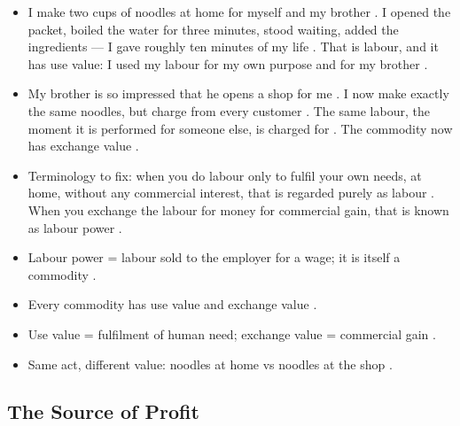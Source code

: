\begin{ExampleBox}
\begin{itemize}
    \item I make two cups of noodles at home for myself and my brother . I opened the packet, boiled the water for three minutes, stood waiting, added the ingredients --- I gave roughly ten minutes of my life . That is labour, and it has use value: I used my labour for my own purpose and for my brother .
    \item My brother is so impressed that he opens a shop for me . I now make exactly the same noodles, but charge  from every customer . The same labour, the moment it is performed for someone else, is charged for . The commodity now has exchange value .
\end{itemize}
\end{ExampleBox}

\begin{itemize}
    \item Terminology to fix: when you do labour only to fulfil your own needs, at home, without any commercial interest, that is regarded purely as labour . When you exchange the labour for money for commercial gain, that is known as labour power .
\end{itemize}

\begin{QuickRevision}
\begin{itemize}
    \item Labour power = labour sold to the employer for a wage; it is itself a commodity .
    \item Every commodity has use value and exchange value .
    \item Use value = fulfilment of human need; exchange value = commercial gain .
    \item Same act, different value: noodles at home vs noodles at the shop .
\end{itemize}
\end{QuickRevision}

\subsection{The Source of Profit}


